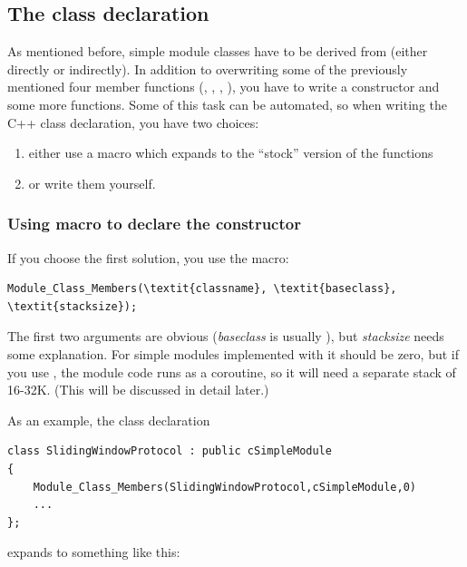 \subsection{The class declaration}

As mentioned before, simple module classes have
to be derived from  (either directly or
indirectly). In addition to overwriting some of the previously
mentioned four member functions (,
, , ), you
have to write a constructor and some more
functions. Some of this task can be automated, so when writing the C++
class declaration, you have two choices:
\begin{enumerate}
\item{either use a macro which expands to the ``stock'' version of the
    functions}
\item{or write them yourself.}
\end{enumerate}

\subsubsection{Using macro to declare the constructor}

If you choose the first solution, you use the
 macro:

\begin{Verbatim}[commandchars=\\\{\}]
Module_Class_Members(\textit{classname}, \textit{baseclass}, \textit{stacksize});
\end{Verbatim}

The first two arguments are obvious (\textit{baseclass} is usually ),
but \textit{stacksize} needs some explanation. For simple modules implemented
with  it should be zero, but if you use ,
the module code runs as a coroutine, so it will need a separate
stack of 16-32K. (This will be discussed in detail later.)


As an example, the class declaration

\begin{verbatim}
class SlidingWindowProtocol : public cSimpleModule
{
    Module_Class_Members(SlidingWindowProtocol,cSimpleModule,0)
    ...
};
\end{verbatim}

expands to something like this:


